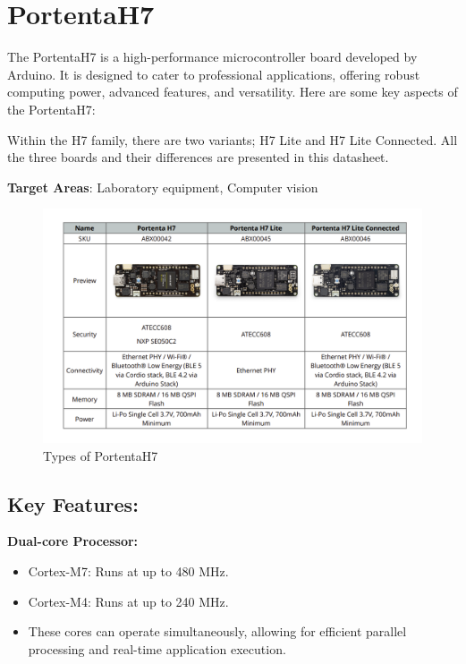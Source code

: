 %
%

\chapter{PortentaH7}
	The PortentaH7 is a high-performance microcontroller board developed by Arduino. It is designed to cater to professional applications, offering robust computing power, advanced features, and versatility. Here are some key aspects of the PortentaH7:
	
	Within the H7 family, there are two variants; H7 Lite and H7 Lite Connected. All the three boards and their differences are presented in this datasheet.
	
	\textbf{Target Areas}: 
	Laboratory equipment, Computer vision
	
	\begin{figure}
		\begin{center}
			\includegraphics[width=0.7\linewidth]{Images/PortentaH7/TypesofPortentaH7.png}
			\caption{Types of PortentaH7}
			\label{Types}
		\end{center}
	\end{figure}
	
\section{Key Features:}

\textbf{Dual-core Processor:}

\begin{itemize}
	\item Cortex-M7: Runs at up to 480 MHz.
	\item Cortex-M4: Runs at up to 240 MHz.
	\item These cores can operate simultaneously, allowing for efficient parallel processing and real-time application execution.
\end{itemize}

